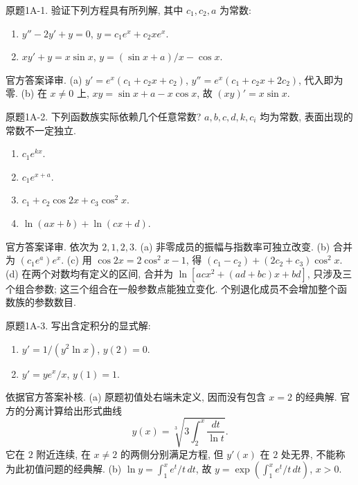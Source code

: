 \begin{exercise}\label{cw:bank-1A-1}
原题1A-1. 验证下列方程具有所列解, 其中 $c_1,c_2,a$ 为常数:
\begin{enumerate}[label=\alph*)]
\item $y''-2y'+y=0$, $y=c_1e^x+c_2xe^x$.
\item $xy'+y=x\sin x$, $y=(\sin x+a)/x-\cos x$.
\end{enumerate}
\end{exercise}
\begin{solution}
官方答案译审. (a) $y'=e^x(c_1+c_2x+c_2)$, $y''=e^x(c_1+c_2x+2c_2)$, 代入即为零. (b) 在 $x\ne0$ 上, $xy=\sin x+a-x\cos x$, 故 $(xy)'=x\sin x$.
\end{solution}
\begin{exercise}\label{cw:bank-1A-2}
原题1A-2. 下列函数族实际依赖几个任意常数? $a,b,c,d,k,c_i$ 均为常数, 表面出现的常数不一定独立.
\begin{enumerate}[label=\alph*)]
\item $c_1e^{kx}$. \item $c_1e^{x+a}$. \item $c_1+c_2\cos2x+c_3\cos^2x$. \item $\ln(ax+b)+\ln(cx+d)$.
\end{enumerate}
\end{exercise}
\begin{solution}
官方答案译审. 依次为 $2,1,2,3$. (a) 非零成员的振幅与指数率可独立改变. (b) 合并为 $(c_1e^a)e^x$. (c) 用 $\cos2x=2\cos^2x-1$, 得 $(c_1-c_2)+(2c_2+c_3)\cos^2x$. (d) 在两个对数均有定义的区间, 合并为 $\ln[acx^2+(ad+bc)x+bd]$, 只涉及三个组合参数; 这三个组合在一般参数点能独立变化. 个别退化成员不会增加整个函数族的参数数目.
\end{solution}
\begin{exercise}\label{cw:bank-1A-3}
原题1A-3. 写出含定积分的显式解:
\begin{enumerate}[label=\alph*)]
\item $y'=1/(y^2\ln x)$, $y(2)=0$.
\item $y'=ye^x/x$, $y(1)=1$.
\end{enumerate}
\end{exercise}
\begin{solution}
依据官方答案补核. (a) 原题初值处右端未定义, 因而没有包含 $x=2$ 的经典解. 官方的分离计算给出形式曲线
\[
 y(x)=\sqrt[3]{3\int_2^x\frac{dt}{\ln t}}.
\]
它在 $2$ 附近连续, 在 $x\ne2$ 的两侧分别满足方程, 但 $y'(x)$ 在 $2$ 处无界, 不能称为此初值问题的经典解. (b) $\ln y=\int_1^x e^t/t\,dt$, 故 $y=\exp(\int_1^x e^t/t\,dt)$, $x>0$.
\end{solution}
